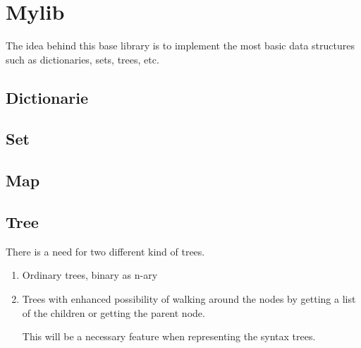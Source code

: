 \section*{Mylib}

The idea behind this base library is to implement the most basic data structures
such as dictionaries, sets, trees, etc. 

\subsection*{Dictionarie}

\subsection*{Set}

\subsection*{Map}

\subsection*{Tree}


There is a need for two different kind of trees.

\begin{enumerate}
\item Ordinary trees, binary as n-ary

\item Trees with enhanced possibility of walking around the nodes by getting
  a list of the children or getting the parent node.

This will be a necessary feature when representing the syntax trees.
\end{enumerate}




